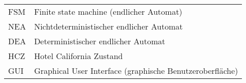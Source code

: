 \begin{tabular}{ll}
FSM & Finite state machine (endlicher Automat)\\
NEA & Nichtdeterministischer endlicher Automat\\
DEA & Deterministischer endlicher Automat\\
HCZ & Hotel California Zustand\\
GUI & Graphical User Interface (graphische Benutzeroberfläche)\\
\end{tabular}
\endinput
